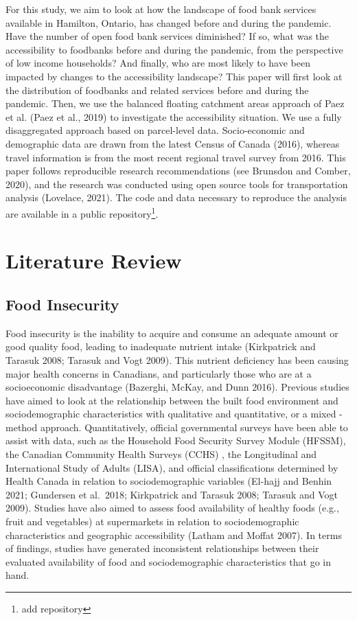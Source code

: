 \documentclass[]{elsarticle} %
\begin{document}
For this study, we aim to look at how the landscape of food bank
services available in Hamilton, Ontario, has changed before and during
the pandemic. Have the number of open food bank services diminished? If
so, what was the accessibility to foodbanks before and during the
pandemic, from the perspective of low income households? And finally,
who are most likely to have been impacted by changes to the
accessibility landscape? This paper will first look at the distribution
of foodbanks and related services before and during the pandemic. Then,
we use the balanced floating catchment areas approach of Paez et al.
(Paez et al., 2019) to investigate the accessibility situation. We use a
fully disaggregated approach based on parcel-level data. Socio-economic
and demographic data are drawn from the latest Census of Canada (2016),
whereas travel information is from the most recent regional travel
survey from 2016. This paper follows reproducible research
recommendations (see Brunsdon and Comber, 2020), and the research was
conducted using open source tools for transportation analysis (Lovelace,
2021). The code and data necessary to reproduce the analysis are
available in a public repository\footnote{add repository}.

\hypertarget{literature-review}{%
\section{Literature Review}\label{literature-review}}

\hypertarget{food-insecurity}{%
\subsection{Food Insecurity}\label{food-insecurity}}

Food insecurity is the inability to acquire and consume an adequate
amount or good quality food, leading to inadequate nutrient intake
(Kirkpatrick and Tarasuk 2008; Tarasuk and Vogt 2009). This nutrient
deficiency has been causing major health concerns in Canadians, and
particularly those who are at a socioeconomic disadvantage (Bazerghi,
McKay, and Dunn 2016). Previous studies have aimed to look at the
relationship between the built food environment and sociodemographic
characteristics with qualitative and quantitative, or a mixed -method
approach. Quantitatively, official governmental surveys have been able
to assist with data, such as the Household Food Security Survey Module
(HFSSM), the Canadian Community Health Surveys (CCHS) , the Longitudinal
and International Study of Adults (LISA), and official classifications
determined by Health Canada in relation to sociodemographic variables
(El-hajj and Benhin 2021; Gundersen et al.~2018; Kirkpatrick and Tarasuk
2008; Tarasuk and Vogt 2009). Studies have also aimed to assess food
availability of healthy foods (e.g., fruit and vegetables) at
supermarkets in relation to sociodemographic characteristics and
geographic accessibility (Latham and Moffat 2007). In terms of findings,
studies have generated inconsistent relationships between their
evaluated availability of food and sociodemographic characteristics that
go in hand.
\end{document}

